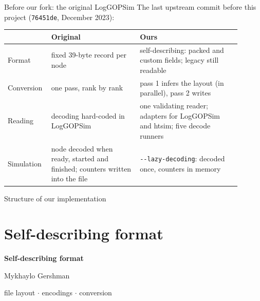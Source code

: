 \documentclass[aspectratio=169,11pt]{beamer}
\newcommand{\diagram}[1]{\resizebox{\linewidth}{!}{}}
\begin{document}
\begin{frame}{Before our fork: the original LogGOPSim}
\small
The last upstream commit before this project (\texttt{76451de}, December 2023):
\vspace{2mm}

{\centering\diagram{original-overview}\par}
\vspace{3mm}
\footnotesize
\begin{tabular}{L{0.13\linewidth}L{0.36\linewidth}L{0.41\linewidth}}
\toprule
 & \textbf{Original} & \textbf{Ours} \\
\midrule
Format & fixed 39-byte record per node & self-describing: packed and custom fields; legacy still readable \\
Conversion & one pass, rank by rank & pass 1 infers the layout (in parallel), pass 2 writes \\
Reading & decoding hard-coded in LogGOPSim & one validating reader; adapters for LogGOPSim and htsim; five decode runners \\
Simulation & node decoded when ready, started and finished; counters written into the file & \texttt{-{}-lazy-decoding}: decoded once, counters in memory \\
\bottomrule
\end{tabular}
\end{frame}

\begin{frame}{Structure of our implementation}
\centering\vfill
\diagram{design-overview}
\vfill
\end{frame}

\section{Self-describing format}

\begin{frame}
\centering\vfill
{\Huge\bfseries Self-describing format\par}
\vspace{4mm}
{\large Mykhaylo Gershman\par}
\vspace{3mm}
{\small\color{black!60}file layout $\cdot$ encodings $\cdot$ conversion\par}
\vfill
\end{frame}
\end{document}
